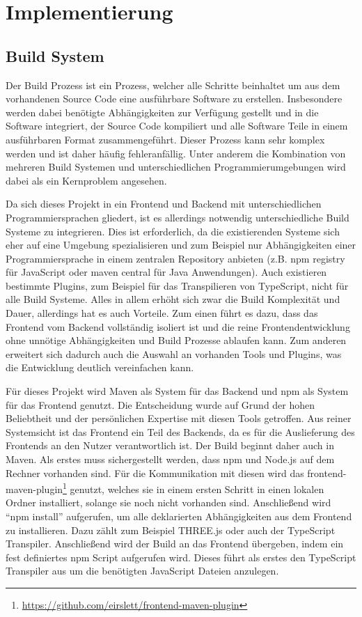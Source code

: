 \chapter{Implementierung}

\section{Build System}
Der Build Prozess ist ein Prozess, welcher alle Schritte beinhaltet um aus dem vorhandenen Source Code eine ausführbare Software zu erstellen. Insbesondere werden dabei benötigte Abhängigkeiten zur Verfügung gestellt und in die Software integriert, der Source Code kompiliert und alle Software Teile in einem ausführbaren Format zusammengeführt. Dieser Prozess kann sehr komplex werden und ist daher häufig fehleranfällig. Unter anderem die Kombination von mehreren Build Systemen und unterschiedlichen Programmierumgebungen wird dabei als ein Kernproblem angesehen. %

Da sich dieses Projekt in ein Frontend und Backend mit unterschiedlichen Programmiersprachen gliedert, ist es allerdings notwendig unterschiedliche Build Systeme zu integrieren. Dies ist erforderlich, da die existierenden Systeme sich eher auf eine Umgebung spezialisieren und zum Beispiel nur Abhängigkeiten einer Programmiersprache in einem zentralen Repository anbieten (z.B. npm registry für JavaScript oder maven central für Java Anwendungen). Auch existieren bestimmte Plugins, zum Beispiel für das Transpilieren von TypeScript, nicht für alle Build Systeme. Alles in allem erhöht sich zwar die Build Komplexität und Dauer, allerdings hat es auch Vorteile. Zum einen führt es dazu, dass das Frontend vom Backend vollständig isoliert ist und die reine Frontendentwicklung ohne unnötige Abhängigkeiten und Build Prozesse ablaufen kann. Zum anderen erweitert sich dadurch auch die Auswahl an vorhanden Tools und Plugins, was die Entwicklung deutlich vereinfachen kann.

Für dieses Projekt wird Maven als System für das Backend und npm als System für das Frontend genutzt. Die Entscheidung wurde auf Grund der hohen Beliebtheit und der persönlichen Expertise mit diesen Tools getroffen. Aus reiner Systemsicht ist das Frontend ein Teil des Backends, da es für die Auslieferung des Frontends an den Nutzer verantwortlich ist. Der Build beginnt daher auch in Maven. Als erstes muss sichergestellt werden, dass npm und Node.js auf dem Rechner vorhanden sind. Für die Kommunikation mit diesen wird das frontend-maven-plugin\footnote{\url{https://github.com/eirslett/frontend-maven-plugin}} genutzt, welches sie in einem ersten Schritt in einen lokalen Ordner installiert, solange sie noch nicht vorhanden sind. Anschließend wird “npm install” aufgerufen, um alle deklarierten Abhängigkeiten aus dem Frontend zu installieren. Dazu zählt zum Beispiel THREE.js oder auch der TypeScript Transpiler. Anschließend wird der Build an das Frontend übergeben, indem ein fest definiertes npm Script aufgerufen wird. Dieses führt als erstes den TypeScript Transpiler aus um die benötigten JavaScript Dateien anzulegen. 

